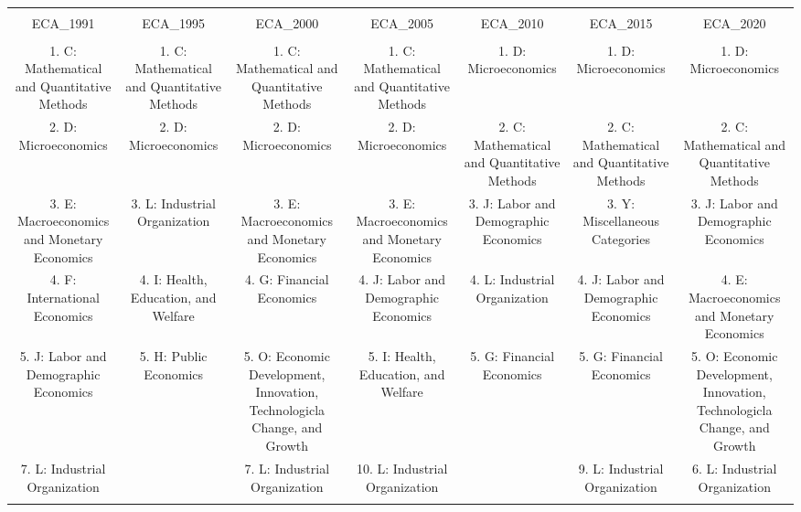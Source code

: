 
\begin{table}[!htbp] \centering 
  \caption{} 
  \label{} 
\begin{tabular}{@{\extracolsep{5pt}} ccccccc} 
\\[-1.8ex]\hline 
\hline \\[-1.8ex] 
ECA\_1991 & ECA\_1995 & ECA\_2000 & ECA\_2005 & ECA\_2010 & ECA\_2015 & ECA\_2020 \\ 
\hline \\[-1.8ex] 
1. C: Mathematical and Quantitative Methods & 1. C: Mathematical and Quantitative Methods & 1. C: Mathematical and Quantitative Methods & 1. C: Mathematical and Quantitative Methods & 1. D: Microeconomics & 1. D: Microeconomics & 1. D: Microeconomics \\ 
2. D: Microeconomics & 2. D: Microeconomics & 2. D: Microeconomics & 2. D: Microeconomics & 2. C: Mathematical and Quantitative Methods & 2. C: Mathematical and Quantitative Methods & 2. C: Mathematical and Quantitative Methods \\ 
3. E: Macroeconomics and Monetary Economics & 3. L: Industrial Organization & 3. E: Macroeconomics and Monetary Economics & 3. E: Macroeconomics and Monetary Economics & 3. J: Labor and Demographic Economics & 3. Y: Miscellaneous Categories & 3. J: Labor and Demographic Economics \\ 
4. F: International Economics & 4. I: Health, Education, and Welfare & 4. G: Financial Economics & 4. J: Labor and Demographic Economics & 4. L: Industrial Organization & 4. J: Labor and Demographic Economics & 4. E: Macroeconomics and Monetary Economics \\ 
5. J: Labor and Demographic Economics & 5. H: Public Economics & 5. O: Economic Development, Innovation, Technologicla Change, and Growth & 5. I: Health, Education, and Welfare & 5. G: Financial Economics & 5. G: Financial Economics & 5. O: Economic Development, Innovation, Technologicla Change, and Growth \\ 
7. L: Industrial Organization &  & 7. L: Industrial Organization & 10. L: Industrial Organization &  & 9. L: Industrial Organization & 6. L: Industrial Organization \\ 
\hline \\[-1.8ex] 
\end{tabular} 
\end{table} 
